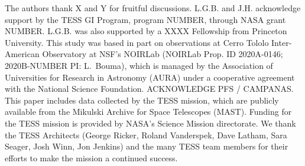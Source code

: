 \documentclass[12pt,twocolumn,tighten]{aastex63}
\begin{document}
\acknowledgements
\raggedbottom

The authors thank X and Y for fruitful discussions.
%
L.G.B. and J.H. acknowledge support by the TESS GI Program, program
NUMBER, through NASA grant NUMBER.
L.G.B. was also supported by a XXXX Fellowship from Princeton
University.
%
This study was based in part on observations at Cerro Tololo
Inter-American Observatory at NSF's NOIRLab (NOIRLab Prop. ID
2020A-0146; 2020B-NUMBER PI: L{.}~Bouma), which is managed by the
Association of Universities for Research in Astronomy (AURA) under a
cooperative agreement with the National Science Foundation.
%
ACKNOWLEDGE PFS / CAMPANAS.
%
This paper includes data collected by the TESS mission, which are
publicly available from the Mikulski Archive for Space Telescopes
(MAST).
%
Funding for the TESS mission is provided by NASA's Science Mission
directorate.
%
We thank the TESS Architects (George Ricker, Roland Vanderspek, Dave
Latham, Sara Seager, Josh Winn, Jon Jenkins) and the many TESS team
members for their efforts to make the mission a continued success.
%

%
%


%
\end{document}
